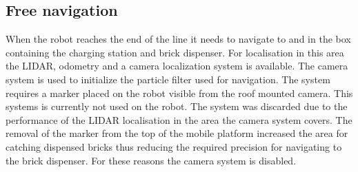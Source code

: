     \subsection{Free navigation} %
    \label{sub:mr_free_navigation}
    When the robot reaches the end of the line it needs to navigate  to and in the box containing the charging station and brick dispenser. For localisation in this area the LIDAR, odometry and a camera localization system is available. The camera system is used to initialize the particle filter used for navigation. The system requires a marker placed on the robot visible from the roof mounted  camera. This systems is currently not used on the robot. The system was discarded due to the performance of the LIDAR localisation in the area the camera system covers. The removal of the marker from the top of the mobile platform increased the area for catching dispensed bricks thus reducing the required precision for navigating to the brick dispenser. For these reasons the camera system is disabled. 
    
